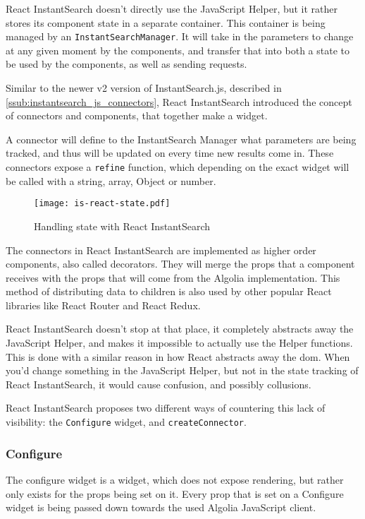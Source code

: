 React InstantSearch doesn't directly use the JavaScript Helper, but it rather stores its component state in a separate container. This container is being managed by an {\tt InstantSearchManager}. It will take in the parameters to change at any given moment by the components, and transfer that into both a state to be used by the components, as well as sending requests.

Similar to the newer v2 version of InstantSearch.js, described in \ref{ssub:instantsearch_js_connectors}, React InstantSearch introduced the concept of connectors and components, that together make a widget.

A connector will define to the InstantSearch Manager what parameters are being tracked, and thus will be updated on every time new results come in. These connectors expose a {\tt refine} function, which depending on the exact widget will be called with a string, array, Object or number.

\begin{figure}[H]
  \centering
  \texttt{[image: is-react-state.pdf]}
  \caption{Handling state with React InstantSearch}
  \label{figure:is-react-state}
\end{figure}

The connectors in React InstantSearch are implemented as higher order components, also called decorators. They will merge the \gls{props} that a component receives with the \gls{props} that will come from the Algolia implementation. This method of distributing data to children is also used by other popular React libraries like React Router and React Redux.

React InstantSearch doesn't stop at that place, it completely abstracts away the JavaScript Helper, and makes it impossible to actually use the Helper functions. This is done with a similar reason in how React abstracts away the \acrshort{dom}. When you'd change something in the JavaScript Helper, but not in the state tracking of React InstantSearch, it would cause confusion, and possibly collusions.

React InstantSearch proposes two different ways of countering this lack of visibility: the {\tt Configure} widget, and {\tt createConnector}.

\subsubsection{Configure}
\label{ssub:ris-configure}

The configure widget is a widget, which does not expose rendering, but rather only exists for the \gls{props} being set on it. Every prop that is set on a Configure widget is being passed down towards the used Algolia JavaScript client.

